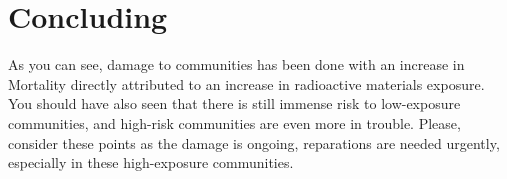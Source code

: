 \documentclass[]{article}
\begin{document}
\section{Concluding}
As you can see, damage to communities has been done with an increase in Mortality directly attributed to an increase in radioactive materials exposure. You should have also seen that there is still immense risk to low-exposure communities, and high-risk communities are even more in trouble. Please, consider these points as the damage is ongoing, reparations are needed urgently, especially in these high-exposure communities.
\end{document}
